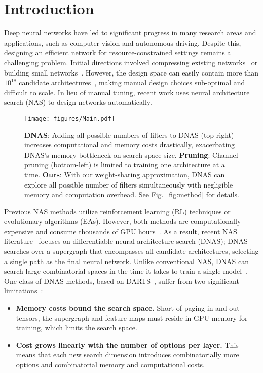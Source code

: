 \documentclass[10pt,twocolumn,letterpaper]{article}
\begin{document}
\section{Introduction}
Deep neural networks have led to significant progress in many research areas and applications, such as computer vision and autonomous driving. Despite this, designing an efficient network for resource-constrained settings remains a challenging problem. Initial directions involved compressing existing networks~\cite{deepcompression} or building small networks~\cite{shufflenetv2, mobilenetv2}. However, the design space can easily contain more than $10^{18}$ candidate architectures~\cite{fbnet, single_path}, making manual design choices sub-optimal and difficult to scale. In lieu of manual tuning, recent work uses neural architecture search (NAS) to design networks automatically.

\begin{figure}[t]
    \centering
    \texttt{[image: figures/Main.pdf]}
    \caption{\textbf{DNAS}: Adding all possible numbers of filters to DNAS (top-right) increases computational and memory costs drastically, exacerbating DNAS's memory bottleneck on search space size. \textbf{Pruning}: Channel pruning (bottom-left) is limited to training one architecture at a time. \textbf{Ours}: With our weight-sharing approximation, DNAS can explore all possible number of filters simultaneously with negligible memory and computation overhead. See Fig.~\ref{fig:method} for details.}
    \label{fig:main}
\end{figure}

Previous NAS methods utilize reinforcement learning (RL) techniques or evolutionary algorithms (EAs). However, both methods are computationally expensive and consume thousands of GPU hours~\cite{nasnet, mnasnet}. As a result, recent NAS literature~\cite{fbnet, darts, enas} focuses on differentiable neural architecture search (DNAS); DNAS searches over a supergraph that encompasses all candidate architectures, selecting a single path as the final neural network. Unlike conventional NAS, DNAS can search large combinatorial spaces in the time it takes to train a single model~\cite{darts, snas, fbnet, single_path}. One class of DNAS methods, based on DARTS~\cite{darts}, suffer from two significant limitations~\cite{nassurvey}:

\begin{itemize}
    \item \textbf{Memory costs bound the search space.} Short of paging in and out tensors, the supergraph and feature maps must reside in GPU memory for training, which limits the search space.
    \item \textbf{Cost grows linearly with the number of options per layer.} This means that each new search dimension introduces combinatorially more options and combinatorial memory and computational costs.
\end{itemize}
\end{document}
